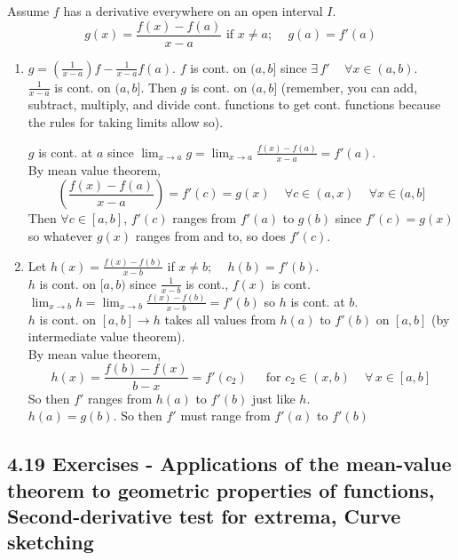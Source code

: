 \documentclass[twoside]{amsart}
\theoremstyle{plain}
\theoremstyle{definition}
\newcommand{\exercisehead}[1]
  {\smallskip
   \noindent{\small\bf Exercise #1.}}
\begin{document}
\exercisehead{10} 
Assume $f$ has a derivative everywhere on an open interval $I$.  
\[
g(x) = \frac{ f(x) - f(a)}{ x- a} \text{ if } x \neq a; \quad \, g(a) = f'(a)
\]
\begin{enumerate}
\item $g = \left( \frac{1}{ x- a} \right) f - \frac{1}{ x- a} f(a)$.  $f$ is cont. on $(a,b]$ since $\exists \, f' \quad \, \forall x \in (a,b)$.  \\
  $\frac{1}{x-a}$ is cont. on $(a,b]$.  Then $g$ is cont. on $(a,b]$ (remember, you can add, subtract, multiply, and divide cont. functions to get cont. functions because the rules for taking limits allow so).  

$g$ is cont. at $a$ since $\lim_{x \to a } g = \lim_{ x \to a} \frac{ f(x) - f(a)}{ x-a} = f'(a)$.  \\

By mean value theorem,
\[
\left( \frac{ f(x) - f(a) }{ x- a} \right) = f'(c) = g(x) \quad \, \forall c \in (a,x) \quad \, \forall x \in (a,b]
\]
Then $\forall c \in [a,b]$, $f'(c)$ ranges from $f'(a)$ to $g(b)$ since $f'(c) = g(x)$ so whatever $g(x)$ ranges from and to, so does $f'(c)$.  
\item Let $h(x) = \frac{ f(x) - f(b)}{ x- b} $ if $x \neq b; \quad \, h(b) = f'(b)$.   \\
$h$ is cont. on $[a,b)$ since $\frac{1}{x-b}$ is cont., $f(x)$ is cont.  \\
  $\lim_{x\to b } h = \lim_{x\to b} \frac{f(x) - f(b)}{ x -b} = f'(b)$ so $h$ is cont. at $b$.   \\

$h$ is cont. on $[a,b] \to h$ takes all values from $h(a)$ to $f'(b)$ on $[a,b]$ (by intermediate value theorem).   \\

By mean value theorem,
\[
h(x) = \frac{f(b)-f(x)}{ b-x } = f'(c_2) \quad \, \text{ for } c_2 \in (x,b) \quad \, \forall \, x \in [a,b] 
\]
So then $f'$ ranges from $h(a)$ to $f'(b)$ just like $h$.   \\

$h(a) = g(b)$.  So then $f'$ must range from $f'(a)$ to $f'(b)$
\end{enumerate}

\subsection*{ 4.19 Exercises - Applications of the mean-value theorem to geometric properties of functions, Second-derivative test for extrema, Curve sketching }
 \quad \\
\end{document}
